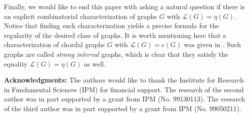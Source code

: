 \documentclass[12pt]{amsart}
\begin{document}
\par \medskip Finally, we would like to end this paper with asking a natural question if there is an explicit combinatorial characterization of graphs $G$ with $\mathcal{L}(G)=\eta(G)$. Notice that finding such characterization yields a precise formula for the regularity of the desired class of graphs. It is worth mentioning here that a characterization of chordal graphs $G$ with $\mathcal{L}(G)=c(G)$ was given in \cite[Theorem~4.2]{RSK}. Such graphs are called \emph{strong interval} graphs, which is clear that they satisfy the equality $\mathcal{L}(G)=\eta(G)$ as well. 
























	
	
	
	
	
	
\vspace{1cm}
\par \textbf{Acknowledgments:} The authors would like to thank the Institute for Research in Fundamental Sciences (IPM) for financial support. The research of the second author was in part supported by a grant from IPM (No. 99130113). The research of the third author was in part supported by a grant from IPM (No. 99050211).
	
\end{document}

